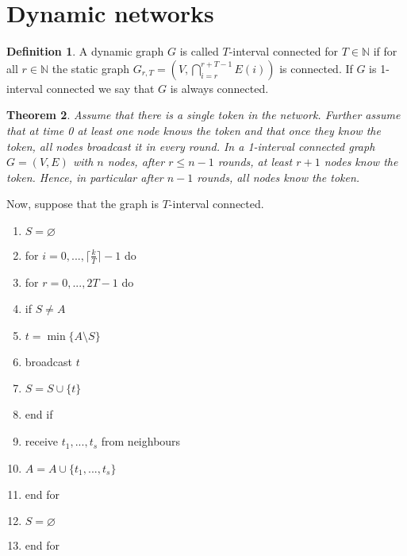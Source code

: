 \documentclass[a4paper, 12pt]{article}
\theoremstyle{plain}
\newtheorem{theorem}{Theorem}[section] %
\theoremstyle{definition}
\newtheorem{definition}[theorem]{Definition} %
\theoremstyle{lemma}
\theoremstyle{remark}
\theoremstyle{corollary}
\theoremstyle{example}
\begin{document}
	\section{Dynamic networks}
	\begin{definition}
		A dynamic graph $G$ is called $T$-interval connected for $T \in \mathbb{N}$ if for all $r\in \mathbb{N}$ the static graph $G_{r,T} = \left(V, \bigcap_{i=r}^{r+T-1} E(i)\right)$ is connected. If $G$ is 1-interval connected we say that $G$ is always connected.
	\end{definition}
	\begin{theorem}
		Assume that there is a single token in the network. Further assume that at time 0 at least one node knows the token and that once they know the token, all nodes broadcast it in every round. In a 1-interval connected graph $G=(V,E)$ with $n$ nodes, after $r\leq n-1$ rounds, at least $r+1$ nodes know the token. Hence, in particular after $n-1$ rounds, all nodes know the token.
	\end{theorem}
	Now, suppose that the graph is $T$-interval connected.
	\begin{enumerate}
		\item $S = \varnothing$
		\item for $i=0,...,\lceil\frac{k}{T}\rceil-1$ do
		\item for $r=0,...,2T-1$ do
		\item if $S \neq A$
		\item $t = \min\{A \setminus S\}$
		\item broadcast $t$
		\item $S = S \cup \{t\}$
		\item end if
		\item receive $t_1,...,t_s$ from neighbours
		\item $A = A \cup \{t_1,...,t_s\}$
		\item end for
		\item $S = \varnothing$
		\item end for
	\end{enumerate}
\end{document}
